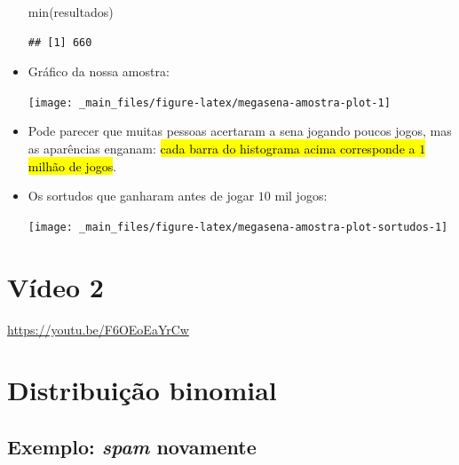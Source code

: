 \documentclass[
  11pt]{report}
\newenvironment{Shaded}{\begin{snugshade}}{\end{snugshade}}
\newcommand{\FunctionTok}[1]{\textcolor[rgb]{0.00,0.00,0.00}{#1}}
\newcommand{\NormalTok}[1]{#1}
\renewenvironment{Shaded}{
    \begin{mdframed}[%
      roundcorner=2pt,%
      innerleftmargin=5pt,%
      innerrightmargin=5pt,%
      topline=true,%
      leftline=true,%
      rightline=true,%
      bottomline=true,%
      linewidth=0.5pt,%
      linecolor=black!20,%
      backgroundcolor=black!2,%
      skipabove=2ex,%
      skipbelow=2.5ex%
    ]%
  }
  {
    \end{mdframed}
  }
\begin{document}
\begin{itemize}
\begin{Shaded}
\begin{Highlighting}[]
\FunctionTok{min}\NormalTok{(resultados)}
\end{Highlighting}
\end{Shaded}

\begin{verbatim}
## [1] 660
\end{verbatim}
\item
  Gráfico da nossa amostra:

  \begin{center}\texttt{[image: \_main\_files/figure-latex/megasena-amostra-plot-1]} \end{center}
\item
  Pode parecer que muitas pessoas acertaram a sena jogando poucos jogos, mas as aparências enganam: {\hl{cada barra do histograma acima corresponde a $1$ milhão de jogos}}.
\item
  Os sortudos que ganharam antes de jogar $10$ mil jogos:

  \begin{center}\texttt{[image: \_main\_files/figure-latex/megasena-amostra-plot-sortudos-1]} \end{center}
\end{itemize}

\hypertarget{vuxeddeo-2-4}{%
\section{Vídeo 2}\label{vuxeddeo-2-4}}

\begin{center} \url{https://youtu.be/F6OEoEaYrCw} \end{center}

\hypertarget{binom}{%
\section{Distribuição binomial}\label{binom}}

\hypertarget{exemplo-spam-novamente}{%
\subsection{\texorpdfstring{Exemplo: \emph{spam} novamente}{Exemplo: spam novamente}}\label{exemplo-spam-novamente}}
\end{document}
